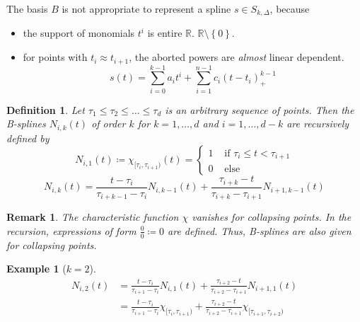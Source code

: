 \documentclass[a4paper]{article}
\newcounter{lecref}[section]
\numberwithin{lecref}{section}
\theoremstyle{break}
\newtheorem{example}[lecref]{Example}
\newtheorem{definition}[lecref]{Definition}
\newtheorem*{Remark}{Remark}
\newcommand{\Set}[1]{\left\{#1\right\}}
\begin{document}
The basis $B$ is not appropriate to represent a spline $s \in S_{k,\Delta}$, because
\begin{itemize}
  \item the support of monomials $t^i$ is entire $\mathbb R$. $\mathbb R \setminus \Set{0}$.
  \item for points with $t_i \approx t_{i+1}$, the aborted powers are \emph{almost} linear dependent.
    \[ s(t) = \sum_{i=0}^{k-1} a_i t^i + \sum_{i=1}^{n-1} c_i (t - t_i)_+^{k-1} \]
\end{itemize}

\begin{definition}
  \label{definition:4-21}
  Let $\tau_1 \leq \tau_2 \leq \dots \leq \tau_d$ is an arbitrary sequence of points.
  Then the B-splines $N_{i,k}(t)$ of order $k$ for $k = 1, \dots, d$ and $i = 1, \dots, d-k$
  are recursively defined by
  \[
    N_{i,1}(t) \coloneqq \chi_{[\tau_i,\tau_{i+1})}(t) = \begin{cases}
      1 & \text{ if } \tau_i \leq t < \tau_{i+1} \\
      0 & \text{ else}
    \end{cases}
  \] \[
    N_{i,k}(t) = \frac{t - \tau_i}{\tau_{i+k-1} - \tau_i} N_{i,k-1}(t) + \frac{\tau_{i+k} - t}{\tau_{i+k} - \tau_{i+1}} N_{i+1,k-1}(t)
  \]
\end{definition}

\begin{Remark}
  The characteristic function $\chi$ vanishes for collapsing points.
  In the recursion, expressions of form $\frac00 \coloneqq 0$ are defined.
  Thus, B-splines are also given for collapsing points.
\end{Remark}

\begin{example}[$k=2$]
  \begin{align*}
    N_{i,2}(t) &= \frac{t - \tau_i}{\tau_{i+1} - \tau_i} N_{i,1}(t) + \frac{\tau_{i+2} - t}{\tau_{i+2} - \tau_{i+1}} N_{i+1,1}(t) \\
      &= \frac{t - \tau_i}{\tau_{i+1} - \tau_i} \chi_{[\tau_i,\tau_{i+1})} + \frac{\tau_{i+2} - t}{\tau_{i+2} - \tau_{i+1}} \chi_{[\tau_{i+1},\tau_{i+2})}
  \end{align*}
\end{example}
\end{document}
